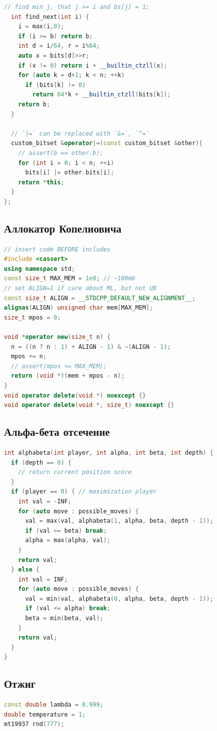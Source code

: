 \documentclass[8pt,a4paper,landscape,twosided]{extarticle}
\begin{document}
\begin{multicols*}{3}
\begin{lstlisting}[language=C++]
  // find min j, that j >= i and bs[j] = 1;
  int find_next(int i) {
    i = max(i,0);
    if (i >= b) return b;
    int d = i/64, r = i%64;
    auto x = bits[d]>>r;
    if (x != 0) return i + __builtin_ctzll(x);
    for (auto k = d+1; k < n; ++k)
      if (bits[k] != 0)
        return 64*k + __builtin_ctzll(bits[k]);
    return b;
  }

  // `|=` can be replaced with `&=`, `^=`
  custom_bitset &operator|=(const custom_bitset &other){
    // assert(b == other.b);
    for (int i = 0; i < n; ++i)
      bits[i] |= other.bits[i];
    return *this;
  }
};
\end{lstlisting}

\subsection{Аллокатор Копелиовича}
\begin{lstlisting}[language=C++]
// insert code BEFORE includes
#include <cassert>
using namespace std;
const size_t MAX_MEM = 1e8; // ~100mb
// set ALIGN=1 if care about ML, but not UB
const size_t ALIGN = __STDCPP_DEFAULT_NEW_ALIGNMENT__;
alignas(ALIGN) unsigned char mem[MAX_MEM];
size_t mpos = 0;

void *operator new(size_t n) {
  n = ((n ? n : 1) + ALIGN - 1) & ~(ALIGN - 1);
  mpos += n;
  // assert(mpos <= MAX_MEM);
  return (void *)(mem + mpos - n);
}
void operator delete(void *) noexcept {}
void operator delete(void *, size_t) noexcept {}
\end{lstlisting}

\subsection{Альфа-бета отсечение}
\begin{lstlisting}[language=C++]
int alphabeta(int player, int alpha, int beta, int depth) {
  if (depth == 0) {
    // return current position score
  }
  if (player == 0) { // maximization player
    int val = -INF;
    for (auto move : possible_moves) {
      val = max(val, alphabeta(1, alpha, beta, depth - 1));
      if (val >= beta) break;
      alpha = max(alpha, val);
    }
    return val;
  } else {
    int val = INF;
    for (auto move : possible_moves) {
      val = min(val, alphabeta(0, alpha, beta, depth - 1));
      if (val <= alpha) break;
      beta = min(beta, val);
    }
    return val;
  }
}
\end{lstlisting}

\subsection{Отжиг}
\begin{lstlisting}[language=C++]
const double lambda = 0.999;
double temperature = 1;
mt19937 rnd(777);


\end{lstlisting}
\end{multicols*}
\end{document}
